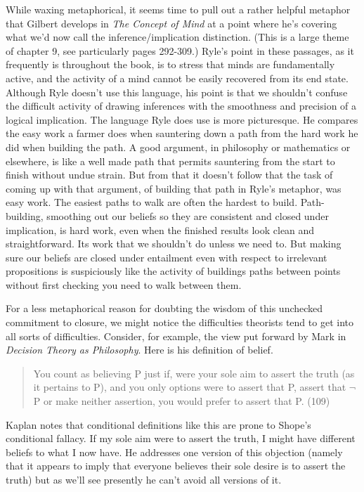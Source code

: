 While waxing metaphorical, it seems time to pull out a rather helpful metaphor that Gilbert \citeauthor{Ryle1949} develops in \textit{The Concept of Mind} at a point where he's covering what we'd now call the inference/implication distinction. (This is a large theme of chapter 9, see particularly pages 292-309.) Ryle's point in these passages, as it frequently is throughout the book, is to stress that minds are fundamentally active, and the activity of a mind cannot be easily recovered from its end state. Although Ryle doesn't use this language, his point is that we shouldn't confuse the difficult activity of drawing inferences with the smoothness and precision of a logical implication. The language Ryle does use is more picturesque. He compares the easy work a farmer does when sauntering down a path from the hard work he did when building the path. A good argument, in philosophy or mathematics or elsewhere, is like a well made path that permits sauntering from the start to finish without undue strain. But from that it doesn't follow that the task of coming up with that argument, of building that path in Ryle's metaphor, was easy work. The easiest paths to walk are often the hardest to build. Path-building, smoothing out our beliefs so they are consistent and closed under implication, is hard work, even when the finished results look clean and straightforward. Its work that we shouldn't do unless we need to. But making sure our beliefs are closed under entailment even with respect to irrelevant propositions is suspiciously like the activity of buildings paths between points without first checking you need to walk between them.

For a less metaphorical reason for doubting the wisdom of this unchecked commitment to closure, we might notice the difficulties theorists tend to get into all sorts of difficulties. Consider, for example, the view put forward by Mark \citeauthor{Kaplan1996} in \textit{Decision Theory as Philosophy}. Here is his definition of belief.

\begin{quote}
You count as believing P just if, were your sole aim to assert the truth (as it pertains to P), and you only options were to assert that P, assert that \(\neg\)P or make neither assertion, you would prefer to assert that P. (109)
\end{quote}

\noindent Kaplan notes that conditional definitions like this are prone to Shope's conditional fallacy. If my sole aim were to assert the truth, I might have different beliefs to what I now have. He addresses one version of this objection (namely that it appears to imply that everyone believes their sole desire is to assert the truth) but as we'll see presently he can't avoid all versions of it.

